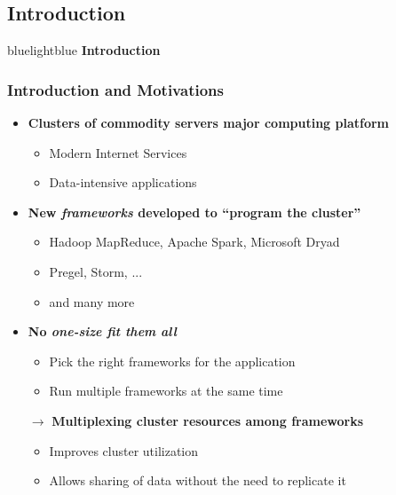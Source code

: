\subsection{Introduction}
\begin{frame}
 \begin{colorblock}{blue}{lightblue}{ }
    \Large \textbf{Introduction}
  \end{colorblock}
\end{frame}

\begin{frame}
\frametitle{Introduction and Motivations}
\begin{itemize}
	\item {\bf Clusters of commodity servers major computing platform}
	\begin{itemize}
		\item Modern Internet Services
		\item Data-intensive applications
	\end{itemize}
	\item {\bf New {\it frameworks} developed to ``program the cluster''}
	\begin{itemize}
		\item Hadoop MapReduce, Apache Spark, Microsoft Dryad
		\item Pregel, Storm, ...
		\item and many more
	\end{itemize}
	\item {\bf No {\it one-size fit them all}}
	\begin{itemize}
		\item Pick the right frameworks for the application
		\item Run multiple frameworks at the same time
	\end{itemize}
	\item[$\to$] {\bf Multiplexing cluster resources among frameworks}
	\begin{itemize}
		\item Improves cluster utilization
		\item Allows sharing of data without the need to replicate it
	\end{itemize}
\end{itemize}
\end{frame}

